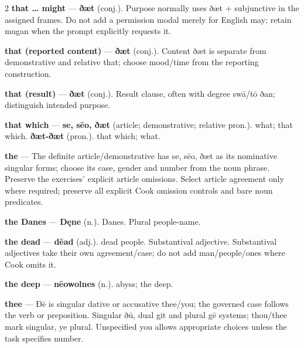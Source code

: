 \begin{multicols}{2}
\textbf{that … might} — \textbf{ðæt} (conj.). Purpose normally uses ðæt + subjunctive in the assigned frames. Do not add a permission modal merely for English may; retain mugan when the prompt explicitly requests it.\par
\textbf{that (reported content)} — \textbf{ðæt} (conj.). Content ðæt is separate from demonstrative and relative that; choose mood/time from the reporting construction.\par
\textbf{that (result)} — \textbf{ðæt} (conj.). Result clause, often with degree swā/tō ðan; distinguish intended purpose.\par
\textbf{that which} — \textbf{se, sēo, ðæt} (article; demonstrative; relative pron.). what; that which. \textbf{ðæt-ðæt} (pron.). that which; what.\par
\textbf{the} — The definite article/demonstrative has se, sēo, ðæt as its nominative singular forms; choose its case, gender and number from the noun phrase. Preserve the exercises’ explicit article omissions. Select article agreement only where required; preserve all explicit Cook omission controls and bare noun predicates.\par
\textbf{the Danes} — \textbf{Dęne} (n.). Danes. Plural people-name.\par
\textbf{the dead} — \textbf{dēad} (adj.). dead people. Substantival adjective. Substantival adjectives take their own agreement/case; do not add man/people/ones where Cook omits it.\par
\textbf{the deep} — \textbf{nēowolnes} (n.). abyss; the deep.\par
\textbf{thee} — Ðē is singular dative or accusative thee/you; the governed case follows the verb or preposition. Singular ðū, dual git and plural gē systems; thou/thee mark singular, ye plural. Unspecified you allows appropriate choices unless the task specifies number.\par

\end{multicols}
